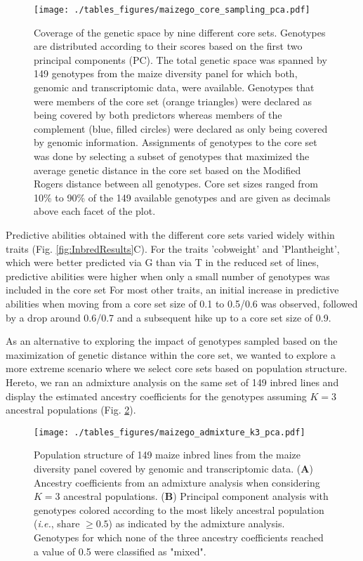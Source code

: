 \documentclass[12pt,titlepage]{article}
\begin{document}
\begin{figure}[H]
\centering
\texttt{[image: ./tables\_figures/maizego\_core\_sampling\_pca.pdf]}
\caption{
  Coverage of the genetic space by nine different core sets. 
  Genotypes are distributed according to their scores based on the first two
  principal components (PC).
  The total genetic space was spanned by 149 genotypes from the maize diversity 
  panel for which both, genomic and transcriptomic data, were available.
  Genotypes that were members of the core set (orange triangles) were declared 
  as being covered by both predictors whereas members of the complement (blue,
  filled circles) were declared as only being covered by genomic information.
  Assignments of genotypes to the core set was done by selecting a subset of
  genotypes that maximized the average genetic distance in the core set based 
  on the Modified Rogers distance between all genotypes.
  Core set sizes ranged from 10\% to 90\% of the 149 available genotypes and
  are given as decimals above each facet of the plot.
}
\label{fig:CoreSetPCA}
\end{figure}


Predictive abilities obtained with the different core sets varied widely within
traits (Fig. \ref{fig:InbredResults}C).
For the traits 'cobweight' and 'Plantheight', which were better predicted via G
than via T in the reduced set of lines, predictive abilities were higher when
only a small number of genotypes was included in the core set
For most other traits, an initial increase in predictive abilities when moving
from a core set size of 0.1 to 0.5/0.6 was observed, followed by a drop around
0.6/0.7 and a subsequent hike up to a core set size of 0.9.

As an alternative to exploring the impact of genotypes sampled based on the
maximization of genetic distance within the core set, we wanted to explore a
more extreme scenario where we select core sets based on population structure.
Hereto, we ran an admixture analysis on the same set of 149 inbred lines and
display the estimated ancestry coefficients for the genotypes assuming $K=3$
ancestral populations (Fig. \ref{fig:PopStructure}).

\begin{figure}[H]
\centering
\texttt{[image: ./tables\_figures/maizego\_admixture\_k3\_pca.pdf]}
\caption{
  Population structure of 149 maize inbred lines from the maize diversity panel
  covered by genomic and transcriptomic data.
  (\textbf{A}) Ancestry coefficients from an admixture analysis when 
  considering $K=3$ ancestral populations.
  (\textbf{B}) Principal component analysis with genotypes colored according to 
  the most likely ancestral population (\textit{i.e.}, share $\geq 0.5$) as 
  indicated by the admixture analysis.
  Genotypes for which none of the three ancestry coefficients reached a value
  of 0.5 were classified as "mixed".
}
\label{fig:PopStructure}
\end{figure}
\end{document}
